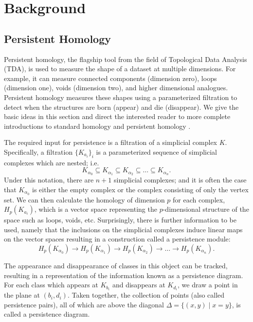 %
%
%
%

\section{Background} \label{sec:background}

\subsection{Persistent Homology}
Persistent homology, the flagship tool from the field of Topological Data Analysis (TDA), is used to measure the shape of a dataset at multiple dimensions. For example, it can measure connected components (dimension zero), loops (dimension one), voids (dimension two), and higher dimensional analogues. 
Persistent homology measures these shapes using a parameterized filtration to detect when the structures are born (appear) and die (disappear). 
We give the basic ideas in this section and direct the interested reader to more complete introductions to 
standard homology \cite{Hatcher,Munkres2}
and persistent homology \cite{Dey2021,Oudot2015,Munch2017}.

The required input for persistence is a filtration of a simplicial complex $K$. 
Specifically,  a filtration $\{K_{a_i}\}_i$ is a parameterized sequence of simplicial complexes which are nested; i.e.
\begin{equation}
K_{\alpha_0} \subseteq K_{\alpha_1} \subseteq K_{\alpha_2} \subseteq \ldots \subseteq K_{\alpha_n}.
\label{eq:nested_complexes}
\end{equation}
Under this notation, there are $n+1$ simplicial complexes; and it is often the case that $K_{\alpha_0}$ is either the empty complex or the complex consisting of only the vertex set. 
We can then calculate the homology of dimension $p$ for each complex, $H_p(K_{a_i})$, which is a vector space representing the $p$-dimensional structure of the space such as loops, voids, etc.
Surprisingly, there is further information to be used, namely that the inclusions on the simplicial complexes induce linear maps on the vector spaces resulting in a construction called a persistence module: 
\begin{equation}
H_p(K_{\alpha_0}) \to H_p(K_{\alpha_1}) \to H_p(K_{\alpha_2}) \to \ldots \to H_p(K_{\alpha_n}).
\label{eq:filtration}
\end{equation}

The appearance and disappearance of classes in this object can be tracked, resulting in a representation of the information known as a persistence diagram. 
For each class which appears at $K_{b_i}$ and disappears at $K_{d_i}$, we draw a point in the plane at $(b_i,d_i)$. 
Taken together, the collection of points (also called persistence pairs), all of which are above the diagonal $\Delta= \{ (x,y) \mid x = y\}$, is called a persistence diagram. 




